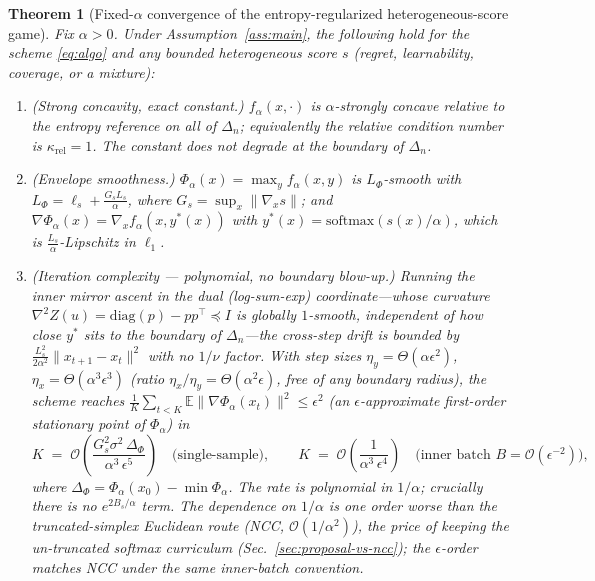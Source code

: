 \documentclass[11pt]{article}
\newtheorem{theorem}{Theorem}
\newcommand{\expect}{\mathbb{E}}
\newcommand{\simplex}{\Delta}
\newcommand{\param}{x}             %
\newcommand{\dist}{y}              %
\newcommand{\score}{s}             %
\begin{document}
\begin{theorem}[Fixed-$\alpha$ convergence of the entropy-regularized heterogeneous-score game]
\label{thm:conv}
Fix $\alpha>0$. Under Assumption~\ref{ass:main}, the following hold for the scheme \eqref{eq:algo} and \emph{any} bounded heterogeneous score $\score$ (regret, learnability, coverage, or a mixture):
\begin{enumerate}[topsep=2pt,itemsep=1pt,label=\textup{(\roman*)}]
  \item \textup{(Strong concavity, exact constant.)} $f_\alpha(\param,\cdot)$ is $\alpha$-strongly concave relative to the entropy reference on all of $\simplex_n$; equivalently the relative condition number is $\kappa_{\mathrm{rel}}=1$. The constant does \emph{not} degrade at the boundary of $\simplex_n$.
  \item \textup{(Envelope smoothness.)} $\Phi_\alpha(\param)=\max_\dist f_\alpha(\param,\dist)$ is $L_\Phi$-smooth with
  $L_\Phi=\ell_s+\tfrac{G_s L_s}{\alpha}$, where $G_s=\sup_\param\|\nabla_\param\score\|$; and $\nabla\Phi_\alpha(\param)=\nabla_\param f_\alpha(\param,\dist^{*}(\param))$ with $\dist^{*}(\param)=\mathrm{softmax}(\score(\param)/\alpha)$, which is $\tfrac{L_s}{\alpha}$-Lipschitz in $\ell_1$.
  \item \textup{(Iteration complexity --- polynomial, no boundary blow-up.)} Running the inner mirror ascent in the \emph{dual} (log-sum-exp) coordinate---whose curvature $\nabla^2 Z(u)=\mathrm{diag}(p)-pp^{\top}\preceq I$ is globally $1$-smooth, \emph{independent} of how close $\dist^{*}$ sits to the boundary of $\simplex_n$---the cross-step drift is bounded by $\tfrac{L_s^2}{2\alpha^2}\|\param_{t+1}-\param_t\|^2$ with \emph{no} $1/\nu$ factor. With step sizes $\eta_\dist=\Theta(\alpha\epsilon^2)$, $\eta_\param=\Theta(\alpha^3\epsilon^3)$ (ratio $\eta_\param/\eta_\dist=\Theta(\alpha^2\epsilon)$, free of any boundary radius), the scheme reaches $\tfrac1K\sum_{t<K}\expect\|\nabla\Phi_\alpha(\param_t)\|^2\le\epsilon^2$ (an $\epsilon$-approximate first-order stationary point of $\Phi_\alpha$) in
  \begin{equation}
    K \;=\; \mathcal{O}\!\left(\frac{G_s^2\sigma^2\,\Delta_\Phi}{\alpha^{3}\,\epsilon^{5}}\right)
    \quad\text{(single-sample)},
    \qquad
    K \;=\; \mathcal{O}\!\left(\frac{1}{\alpha^{3}\,\epsilon^{4}}\right)
    \quad\text{(inner batch }B=\mathcal{O}(\epsilon^{-2})\text{)},
    \label{eq:complexity}
  \end{equation}
  where $\Delta_\Phi=\Phi_\alpha(\param_0)-\min\Phi_\alpha$. The rate is \emph{polynomial} in $1/\alpha$; crucially there is \emph{no} $e^{2B_s/\alpha}$ term. The dependence on $1/\alpha$ is one order worse than the truncated-simplex Euclidean route (NCC, $\mathcal{O}(1/\alpha^2)$), the price of keeping the \emph{un-truncated} softmax curriculum (Sec.~\ref{sec:proposal-vs-ncc}); the $\epsilon$-order matches NCC under the same inner-batch convention.

\end{enumerate}
\end{theorem}
\end{document}
